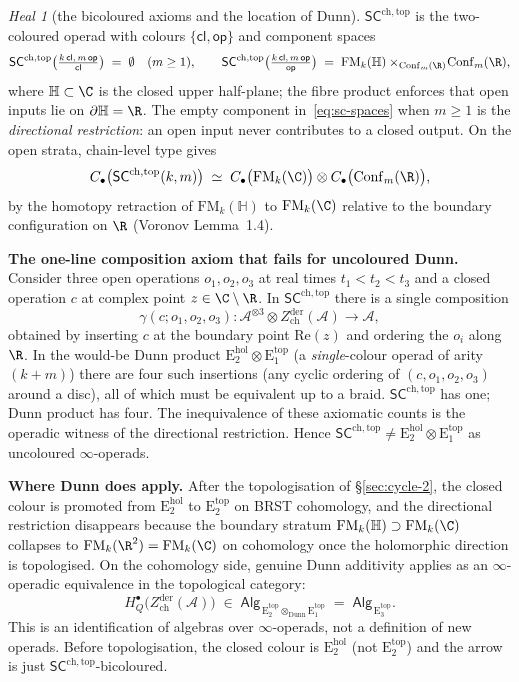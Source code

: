 \documentclass{article}
\theoremstyle{definition}
\theoremstyle{remark}
\newtheorem{heal}[theorem]{Heal}
\newcommand{\SCchtop}{\mathsf{SC}^{\mathrm{ch,top}}}
\newcommand{\Zder}{Z^{\mathrm{der}}_{\mathrm{ch}}}
\newcommand{\Ehol}[1]{\mathrm{E}_{#1}^{\mathrm{hol}}}
\newcommand{\Etop}[1]{\mathrm{E}_{#1}^{\mathrm{top}}}
\newcommand{\cA}{\mathcal{A}}
\newcommand{\FM}{\mathrm{FM}}
\newcommand{\Conf}{\mathrm{Conf}}
\begin{document}
\begin{heal}[the bicoloured axioms and the location of Dunn]
$\SCchtop$ is the two-coloured operad with colours
$\{\mathsf{cl}, \mathsf{op}\}$ and component spaces
\begin{equation}\label{eq:sc-spaces}
 \SCchtop\bigl(\tfrac{k\,\mathsf{cl},\,m\,\mathsf{op}}{\mathsf{cl}}\bigr)
 \;=\;\emptyset\quad(m\geq 1),
 \qquad
 \SCchtop\bigl(\tfrac{k\,\mathsf{cl},\,m\,\mathsf{op}}{\mathsf{op}}\bigr)
 \;=\;\FM_k(\mathbb{H})\times_{\Conf_m(\R)}\!\Conf_m(\R),
\end{equation}
where $\mathbb{H}\subset\C$ is the closed upper half-plane; the fibre
product enforces that open inputs lie on $\partial\mathbb{H} = \R$.
The empty component in~\eqref{eq:sc-spaces} when $m\geq 1$ is the
\emph{directional restriction}: an open input never contributes to a
closed output. On the open strata, chain-level type gives
\begin{equation}\label{eq:sc-chain}
 C_{\bullet}\bigl(\SCchtop(k,m)\bigr)
 \;\simeq\;
 C_{\bullet}\bigl(\FM_k(\C)\bigr)\otimes
 C_{\bullet}\bigl(\Conf_m(\R)\bigr),
\end{equation}
by the homotopy retraction of $\FM_k(\mathbb{H})$ to $\FM_k(\C)$
relative to the boundary configuration on $\R$
(Voronov \cite{Voronov1998} Lemma~1.4).

\textbf{The one-line composition axiom that fails for
uncoloured Dunn.} Consider three open operations $o_1, o_2, o_3$
at real times $t_1 < t_2 < t_3$ and a closed operation $c$ at
complex point $z \in \C\setminus\R$. In $\SCchtop$ there is a
single composition
\[
 \gamma(c; o_1, o_2, o_3)\colon
 \cA^{\otimes 3} \otimes \Zder(\cA) \to \cA,
\]
obtained by inserting $c$ at the boundary point $\mathrm{Re}(z)$
and ordering the $o_i$ along $\R$. In the would-be Dunn product
$\Ehol{2} \otimes \Etop{1}$ (a \emph{single}-colour operad of arity
$(k+m)$) there are four such insertions (any cyclic ordering of
$(c, o_1, o_2, o_3)$ around a disc), all of which must be equivalent
up to a braid. $\SCchtop$ has one; Dunn product has four. The
inequivalence of these axiomatic counts is the operadic witness of
the directional restriction. Hence $\SCchtop \neq \Ehol{2}
\otimes \Etop{1}$ as uncoloured $\infty$-operads.

\textbf{Where Dunn does apply.} After the topologisation of
\S\ref{sec:cycle-2}, the closed colour is promoted from
$\Ehol{2}$ to $\Etop{2}$ on BRST cohomology, and the directional
restriction disappears because the boundary stratum
$\FM_k(\mathbb{H}) \supset \FM_k(\C)$ collapses to
$\FM_k(\R^2) = \FM_k(\C)$ on cohomology once the holomorphic
direction is topologised. On the cohomology side, genuine Dunn
additivity applies as an $\infty$-operadic equivalence in the
topological category:
\begin{equation}\label{eq:dunn-on-cohomology}
 H^{\bullet}_{Q}\bigl(\Zder(\cA)\bigr)\;\in\;
 \mathsf{Alg}_{\,\Etop{2}\otimes_{\mathrm{Dunn}}\Etop{1}}
 \;=\;\mathsf{Alg}_{\,\Etop{3}}.
\end{equation}
This is an identification of algebras over $\infty$-operads, not a
definition of new operads. Before topologisation, the closed colour
is $\Ehol{2}$ (not $\Etop{2}$) and the arrow is just
$\SCchtop$-bicoloured.
\end{heal}
\end{document}
